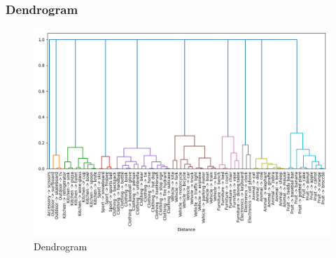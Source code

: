 \documentclass{article}
\begin{document}
    \subsubsection{Dendrogram}\label{subsubsec:dendrogram}

    \begin{figure}[htbp]
        \centering
        \includegraphics[width=1 \textwidth]{img/dendrogram}
        \caption{Dendrogram}
        \label{fig:dendrogram}
    \end{figure}
\end{document}
